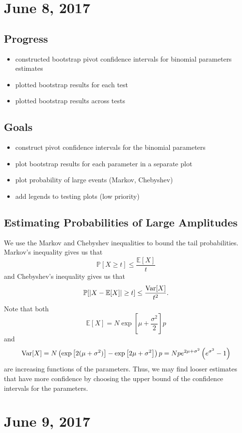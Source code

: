 \documentclass{article}
\begin{document}
\section{June 8, 2017}
\subsection{Progress}
\begin{itemize}
  \item constructed bootstrap pivot confidence intervals for binomial parameters estimates
  \item plotted bootstrap results for each test
  \item plotted bootstrap results across tests
\end{itemize}

\subsection{Goals}
\begin{itemize}
  \item construct pivot confidence intervals for the binomial parameters
  \item plot bootstrap results for each parameter in a separate plot
  \item plot probability of large events (Markov, Chebyshev)
  \item add legends to testing plots (low priority)
\end{itemize}

\subsection{Estimating Probabilities of Large Amplitudes}
We use the Markov and Chebyshev inequalities to bound the tail probabilities. Markov's inequality gives us that
\[
  \mathbb P[X\geq t]\leq \frac{\mathbb E[X]}t
\]
and Chebyshev's inequality gives us that
\[
  \mathbb P[\left\vert X-\mathbb E[X]\right\vert\geq t]\leq \frac{\operatorname{Var}[X]}{t^2}.
\]
Note that both
\[
  \mathbb E[X] = N\exp\left[\mu + \frac{\sigma^2}2\right]p
\]
and
\[
  \operatorname{Var}[X] = N\left(\exp\left[2(\mu+\sigma^2)\right] - \exp\left[2\mu+\sigma^2\right]\right)p = Npe^{2\mu+\sigma^2}\left(e^{\sigma^2}-1\right)
\]
are increasing functions of the parameters. Thus, we may find looser estimates that have more confidence by choosing the upper bound of the confidence intervals for the parameters.

\section{June 9, 2017}
\end{document}
